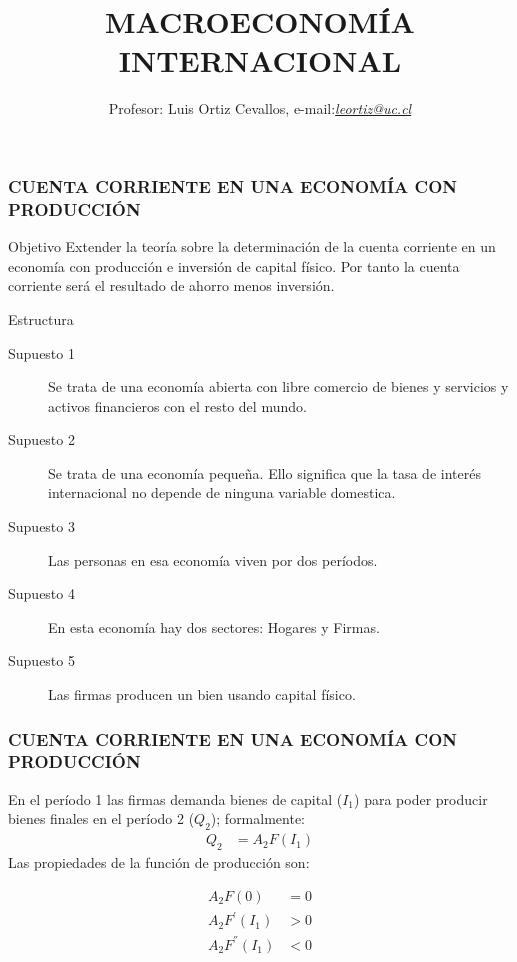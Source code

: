 \documentclass[10pt, xcolor=table, x11names]{beamer}
\author[Luis Ortiz Cevallos e-mail: \href{leortiz@uc.cl}{\textit{leortiz@uc.cl}}]{Profesor: Luis Ortiz Cevallos, e-mail:\href{leortiz@uc.cl}{\textit{leortiz@uc.cl}} }
\title[MACRO INTERNACIONAL]{\vspace*{1.0em} MACROECONOMÍA INTERNACIONAL}
\date[\href{https://ortiz-cevallos.github.io/luisortiz.github.io/ }{\textit{https://ortiz-cevallos.github.io/luisortiz.github.io/}}]{}
\begin{document}
\begin{frame}
\titlepage
\end{frame}


\begin{frame}[label=1]
	\frametitle{{\normalsize CUENTA CORRIENTE EN UNA ECONOMÍA CON PRODUCCIÓN } {}}
	\begin{block} {Objetivo}
		Extender la teoría sobre la determinación de la cuenta corriente en un economía con producción e inversión de capital físico. Por tanto la cuenta corriente será el resultado de ahorro menos inversión. 	
	\end{block}	
	\begin{block} {Estructura}
		\begin{description}
			\item[Supuesto 1] Se trata de una economía abierta con libre comercio de bienes y servicios y activos financieros con el resto del mundo.
			\item[Supuesto 2] Se trata de una economía pequeña. Ello significa que la tasa de interés internacional no depende de ninguna variable domestica.
			\item[Supuesto 3] Las personas en esa economía viven por dos períodos. 	
			\item[Supuesto 4] En esta economía hay dos sectores: Hogares y Firmas.
			\item[Supuesto 5] Las firmas producen un bien usando capital físico.
		\end{description}
	\end{block}	
\end{frame}

\begin{frame}[label=2]
	\frametitle{{\normalsize CUENTA CORRIENTE EN UNA ECONOMÍA CON PRODUCCIÓN } {}}
	En el período 1 las firmas demanda bienes de capital ($I_{1}$) para poder producir bienes finales en el período 2 ($Q_{2}$); formalmente:
		\begin{align}
		Q_{2}&=A_{2}F(I_{1})
		\end{align}
	Las propiedades de la función de producción son:
	
\begin{align}
		A_{2}F(0)&=0\nonumber\\
		A_{2}F^{'}(I_{1})&>0\nonumber\\
		A_{2}F^{''}(I_{1})&<0\nonumber
	
\end{align}	
\end{frame}
\end{document}
